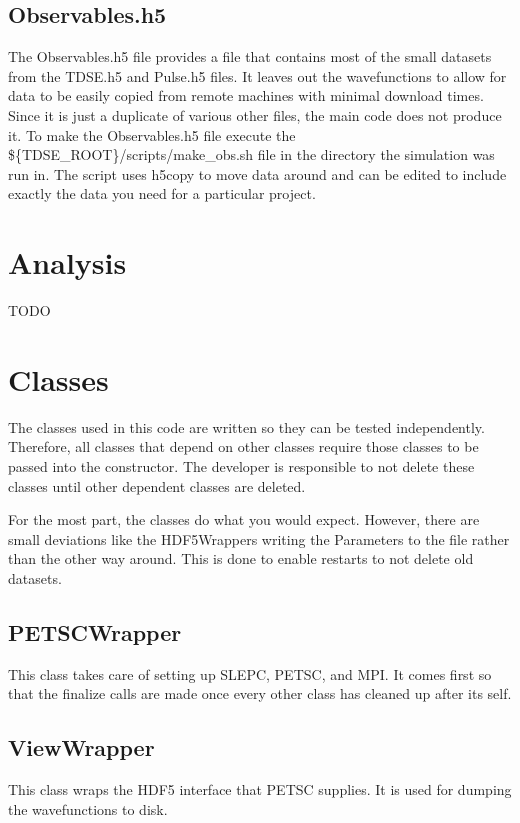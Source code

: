 \documentclass{article}
\begin{document}
\subsection{Observables.h5} %
\label{sub:observables_h5}
The Observables.h5 file provides a file that contains most of the small datasets from the TDSE.h5 and Pulse.h5 files. It leaves out the wavefunctions to allow for data to be easily copied from remote machines with minimal download times. Since it is just a duplicate of various other files, the main code does not produce it. To make the Observables.h5 file execute the \$\{TDSE\_ROOT\}/scripts/make\_obs.sh file in the directory the simulation was run in. The script uses h5copy to move data around and can be edited to include exactly the data you need for a particular project.


\section{Analysis} %
\label{sec:analysis}
TODO



\section{Classes} %
\label{sec:classes}

The classes used in this code are written so they can be tested independently. Therefore, all classes that depend on other classes require those classes to be passed into the constructor. The developer is responsible to not delete these classes until other dependent classes are deleted.

For the most part, the classes do what you would expect. However, there are small deviations like the HDF5Wrappers writing the Parameters to the file rather than the other way around. This is done to enable restarts to not delete old datasets.

\subsection{PETSCWrapper} %
\label{sub:petscwrapper}
This class takes care of setting up SLEPC, PETSC, and MPI. It comes first so that the finalize calls are made once every other class has cleaned up after its self.

\subsection{ViewWrapper} %
\label{sub:viewwrapper}
This class wraps the HDF5 interface that PETSC supplies. It is used for dumping the wavefunctions to disk.
\end{document}
